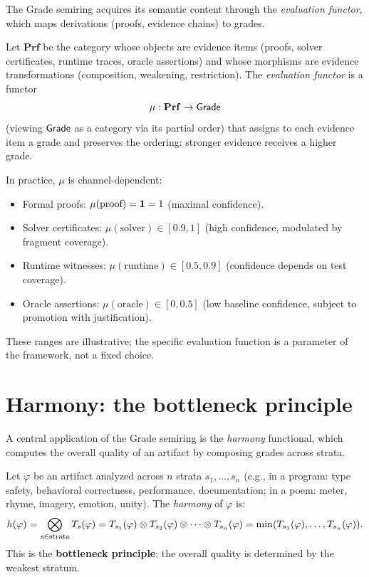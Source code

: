 The Grade semiring acquires its semantic content through the
\emph{evaluation functor}, which maps derivations (proofs, evidence
chains) to grades.

\begin{definition}
\label{def:evaluation-functor}
Let $\mathbf{Prf}$ be the category whose objects are evidence items
(proofs, solver certificates, runtime traces, oracle assertions) and
whose morphisms are evidence transformations (composition, weakening,
restriction).  The \emph{evaluation functor} is a functor
\[
  \mu : \mathbf{Prf} \to \mathsf{Grade}
\]
(viewing $\mathsf{Grade}$ as a category via its partial order) that assigns to
each evidence item a grade and preserves the ordering: stronger
evidence receives a higher grade.
\end{definition}

\begin{remark}
\label{rem:channel-evaluation}
In practice, $\mu$ is channel-dependent:
\begin{itemize}[nosep]
\item Formal proofs: $\mu(\text{proof}) = \mathbf{1} = 1$ (maximal confidence).
\item Solver certificates: $\mu(\text{solver}) \in [0.9, 1]$
  (high confidence, modulated by fragment coverage).
\item Runtime witnesses: $\mu(\text{runtime}) \in [0.5, 0.9]$
  (confidence depends on test coverage).
\item Oracle assertions: $\mu(\text{oracle}) \in [0, 0.5]$
  (low baseline confidence, subject to promotion with justification).
\end{itemize}
These ranges are illustrative; the specific evaluation function is a
parameter of the framework, not a fixed choice.
\end{remark}



\section{Harmony: the bottleneck principle}
\label{sec:grade:harmony}

A central application of the Grade semiring is the \emph{harmony}
functional, which computes the overall quality of an artifact by
composing grades across strata.

\begin{definition}[Harmony]
\label{def:harmony}
Let $\varphi$ be an artifact analyzed across $n$ strata
$s_1, \ldots, s_n$ (e.g., in a program: type safety, behavioral
correctness, performance, documentation; in a poem: meter, rhyme,
imagery, emotion, unity).  The \emph{harmony} of $\varphi$ is:
\[
  h(\varphi) = \bigotimes_{s \in \text{strata}} T_s(\varphi)
  = T_{s_1}(\varphi) \otimes T_{s_2}(\varphi) \otimes \cdots \otimes T_{s_n}(\varphi)
  = \min(T_{s_1}(\varphi), \ldots, T_{s_n}(\varphi)).
\]
This is the \textbf{bottleneck principle}: the overall quality is
determined by the weakest stratum.
\end{definition}

